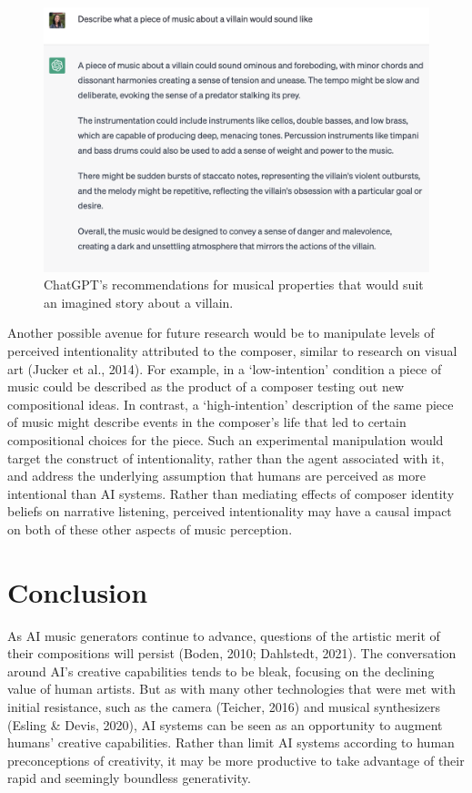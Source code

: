 \documentclass[12pt,twoside]{reedthesis}
\begin{document}
\begin{figure}[h!tbp]
	\centering
	\includegraphics[scale=0.25]{chatgpt.png}
	\caption{ChatGPT's recommendations for musical properties that would suit an imagined story about a villain.}
	\label{fig-chatgpt}
\end{figure}

Another possible avenue for future research would be to manipulate levels of perceived intentionality attributed to the composer, similar to research on visual art (Jucker et al., 2014). For example, in a ‘low-intention’ condition a piece of music could be described as the product of a composer testing out new compositional ideas. In contrast, a ‘high-intention’ description of the same piece of music might describe events in the composer’s life that led to certain compositional choices for the piece. Such an experimental manipulation would target the construct of intentionality, rather than the agent associated with it, and address the underlying assumption that humans are perceived as more intentional than AI systems. Rather than mediating effects of composer identity beliefs on narrative listening, perceived intentionality may have a causal impact on both of these other aspects of music perception.

\section*{Conclusion}

As AI music generators continue to advance, questions of the artistic merit of their compositions will persist (Boden, 2010; Dahlstedt, 2021). The conversation around AI’s creative capabilities tends to be bleak, focusing on the declining value of human artists. But as with many other technologies that were met with initial resistance, such as the camera (Teicher, 2016) and musical synthesizers (Esling \& Devis, 2020), AI systems can be seen as an opportunity to augment humans’ creative capabilities. Rather than limit AI systems according to human preconceptions of creativity, it may be more productive to take advantage of their rapid and seemingly boundless generativity. 
\end{document}
